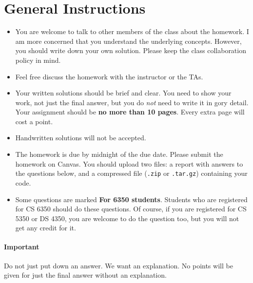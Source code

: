 
\section*{General Instructions}

{\footnotesize
  \begin{itemize}
  \item You are welcome to talk to other members of the class about the
    homework. I am more concerned that you understand the underlying
    concepts. However, you should write down your own solution. Please keep the
    class collaboration policy in mind.

  \item Feel free discuss the homework with the instructor or the TAs.

  \item Your written solutions should be brief and clear. You need to show your
    work, not just the final answer, but you do \emph{not} need to write it in
    gory detail. Your assignment should be {\bf no more than 10 pages}. Every
    extra page will cost a point.

  \item Handwritten solutions will not be accepted.

  \item The homework is due by midnight of the due date. Please submit the
    homework on Canvas. You should upload two files: a report with answers to
    the questions below, and a compressed file (\texttt{.zip} or
    \texttt{.tar.gz}) containing your code.

  \item Some questions are marked {\bf For 6350 students}. Students who are
    registered for CS 6350 should do these questions. Of course, if you are
    registered for CS 5350 or DS 4350, you are welcome to do the question too,
    but you will not get any credit for it.

  \end{itemize}

  \paragraph{Important} Do not just put down an answer. We want an
  explanation. No points will be given for just the final answer
  without an
  explanation.



}

